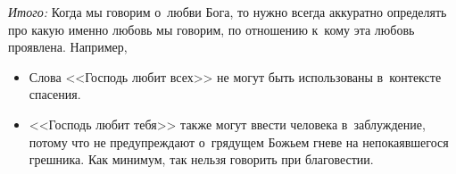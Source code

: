 \documentclass[a4paper,12pt]{article}
\begin{document}
\emph{Итого:} Когда мы говорим о~любви Бога, то нужно всегда аккуратно определять про какую именно любовь мы говорим, по отношению к~кому эта любовь проявлена. Например, 
\begin{itemize}
    \item Слова <<Господь любит всех>> не могут быть использованы в~контексте спасения. 
    \item <<Господь любит тебя>> также могут ввести человека в~заблуждение, потому что не предупреждают о~грядущем Божьем гневе на непокаявшегося грешника. Как минимум, так нельзя говорить при благовестии.
\end{itemize}
\end{document}
